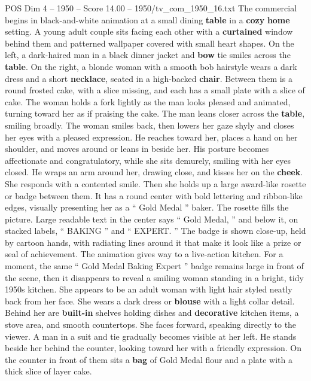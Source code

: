 \begin{textsample}{POS Dim 4 – 1950 – Score 14.00 – 1950/tv\_com\_1950\_16.txt}  \label{ex:f4_pos_036}
The commercial begins in black-and-white animation at a small dining \textbf{table} in a \textbf{cozy} \textbf{home} setting.
A young adult couple sits facing each other with a \textbf{curtained} window behind them and patterned wallpaper covered with small heart shapes.
On the left, a dark-haired man in a black dinner jacket and \textbf{bow} tie smiles across the \textbf{table}.
On the right, a blonde woman with a smooth bob hairstyle wears a dark dress and a short \textbf{necklace}, seated in a high-backed \textbf{chair}.
Between them is a round frosted cake, with a slice missing, and each has a small plate with a slice of cake.
The woman holds a fork lightly as the man looks pleased and animated, turning toward her as if praising the cake.
The man leans closer across the \textbf{table}, smiling broadly.
The woman smiles back, then lowers her gaze shyly and closes her eyes with a pleased expression.
He reaches toward her, places a hand on her shoulder, and moves around or leans in beside her.
His posture becomes affectionate and congratulatory, while she sits demurely, smiling with her eyes closed.
He wraps an arm around her, drawing close, and kisses her on the \textbf{cheek}.
She responds with a contented smile.
Then she holds up a large award-like rosette or badge between them.
It has a round center with bold lettering and ribbon-like edges, visually presenting her as a “ Gold Medal ” baker.
The rosette fills the picture.
Large readable text in the center says “ Gold Medal, ” and below it, on stacked labels, “ BAKING ” and “ EXPERT. ” The badge is shown close-up, held by cartoon hands, with radiating lines around it that make it look like a prize or seal of achievement.
The animation gives way to a live-action kitchen.
For a moment, the same “ Gold Medal Baking Expert ” badge remains large in front of the scene, then it disappears to reveal a smiling woman standing in a bright, tidy 1950s kitchen.
She appears to be an adult woman with light hair styled neatly back from her face.
She wears a dark dress or \textbf{blouse} with a light collar detail.
Behind her are \textbf{built-in} shelves holding dishes and \textbf{decorative} kitchen items, a stove area, and smooth countertops.
She faces forward, speaking directly to the viewer.
A man in a suit and tie gradually becomes visible at her left.
He stands beside her behind the counter, looking toward her with a friendly expression.
On the counter in front of them sits a \textbf{bag} of Gold Medal flour and a plate with a thick slice of layer cake.

\end{textsample}
